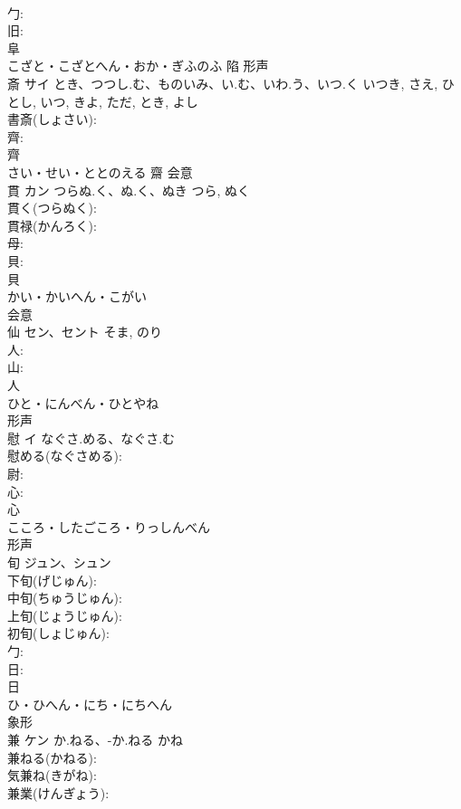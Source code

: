 \documentclass[8pt]{extreport}
\begin{document}
\begin{CJK}{UTF8}{min}
\\	勹: 
\\	旧: 
\\	阜	
\\	こざと・こざとへん・おか・ぎふのふ	陷	形声 
\\	斎	サイ	とき、つつし.む、ものいみ、い.む、いわ.う、いつ.く	いつき, さえ, ひとし, いつ, きよ, ただ, とき, よし	
\\	書斎(しょさい): 
\\	齊: 
\\	齊	
\\	さい・せい・ととのえる	齋	会意 
\\	貫	カン	つらぬ.く、ぬ.く、ぬき	つら, ぬく	
\\	貫く(つらぬく): 
\\	貫禄(かんろく): 
\\	母: 
\\	貝: 
\\	貝	
\\	かい・かいへん・こがい	
\\	会意 
\\	仙	セン、セント		そま, のり	
\\	人: 
\\	山: 
\\	人	
\\	ひと・にんべん・ひとやね	
\\	形声 
\\	慰	イ	なぐさ.める、なぐさ.む		
\\	慰める(なぐさめる): 
\\	尉: 
\\	心: 
\\	心	
\\	こころ・したごころ・りっしんべん	
\\	形声 
\\	旬	ジュン、シュン			
\\	下旬(げじゅん): 
\\	中旬(ちゅうじゅん): 
\\	上旬(じょうじゅん): 
\\	初旬(しょじゅん): 
\\	勹: 
\\	日: 
\\	日	
\\	ひ・ひへん・にち・にちへん	
\\	象形 
\\	兼	ケン	か.ねる、-か.ねる	かね	
\\	兼ねる(かねる): 
\\	気兼ね(きがね): 
\\	兼業(けんぎょう): 

\end{CJK}
\end{document}

